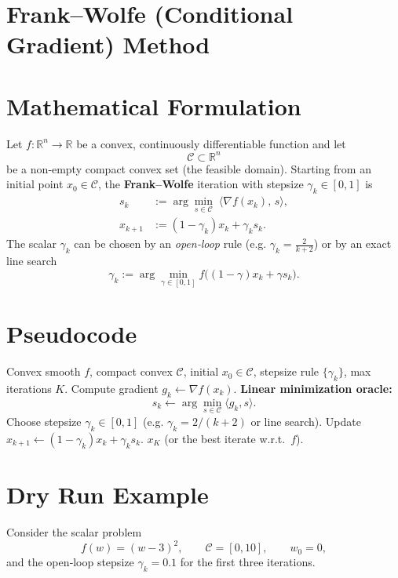 \documentclass{article}
\begin{document}
\section*{Frank–Wolfe (Conditional Gradient) Method}

\section*{Mathematical Formulation}
Let $f:\mathbb{R}^n\to\mathbb{R}$ be a convex, continuously differentiable function and let 
\[
\mathcal{C}\subset\mathbb{R}^n
\]
be a non‑empty compact convex set (the feasible domain).  
Starting from an initial point $x_0\in\mathcal{C}$, the \textbf{Frank–Wolfe} iteration with stepsize $\gamma_k\in[0,1]$ is
\begin{align}
s_k &:= \arg\min_{s\in\mathcal{C}}\;\langle \nabla f(x_k),\,s\rangle , \tag{FW1}\\[4pt]
x_{k+1} &:= (1-\gamma_k)x_k+\gamma_k s_k . \tag{FW2}
\end{align}
The scalar $\gamma_k$ can be chosen by an \emph{open‑loop} rule (e.g. $\gamma_k=\frac{2}{k+2}$) or by an exact line search
\[
\gamma_k:=\arg\min_{\gamma\in[0,1]} f\bigl((1-\gamma)x_k+\gamma s_k\bigr).
\]

\section*{Pseudocode}
\begin{algorithm}[H]
\caption{Frank–Wolfe algorithm}
\begin{algorithmic}[1]
\REQUIRE Convex smooth $f$, compact convex $\mathcal{C}$, initial $x_0\in\mathcal{C}$, stepsize rule $\{\gamma_k\}$, max iterations $K$.
    \STATE Compute gradient $g_k\gets\nabla f(x_k)$.
    \STATE \textbf{Linear minimization oracle:}
          \[
          s_k \gets \arg\min_{s\in\mathcal{C}}\langle g_k,s\rangle .
          \]
    \STATE Choose stepsize $\gamma_k\in[0,1]$ (e.g. $\gamma_k=2/(k+2)$ or line search).
    \STATE Update $x_{k+1}\gets (1-\gamma_k)x_k+\gamma_k s_k$.
\ENDFOR
\RETURN $x_K$ (or the best iterate w.r.t.\ $f$).
\end{algorithmic}
\end{algorithm}

\section*{Dry Run Example}
Consider the scalar problem
\[
f(w)=(w-3)^2,\qquad \mathcal{C}=[0,10],\qquad w_0=0,
\]
and the open‑loop stepsize $\gamma_k=0.1$ for the first three iterations.
\end{document}
